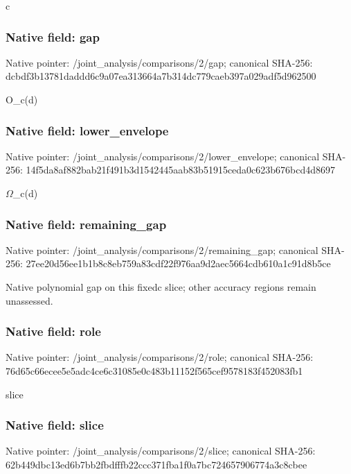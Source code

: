 \documentclass[10pt,a4paper]{article}
\begin{document}
c


\subsubsection{Native field: gap}


Native pointer: /joint\_analysis/comparisons/2/gap; canonical SHA-256: dcbdf3b13781daddd6c9a07e\allowbreak{}a313664a7b314dc779caeb39\allowbreak{}7a029adf5d962500


O\_c(d)


\subsubsection{Native field: lower\_envelope}


Native pointer: /joint\_analysis/comparis\allowbreak{}ons/2/lower\_envelope; canonical SHA-256: 14f5da8af882bab21f491b3d\allowbreak{}1542445aab83b51915ceda0c\allowbreak{}623b676bcd4d8697


\ensuremath{\Omega}\_c(d)


\subsubsection{Native field: remaining\_gap}


Native pointer: /joint\_analysis/comparis\allowbreak{}ons/2/remaining\_gap; canonical SHA-256: 27ee20d56ee1b1b8c8eb759a\allowbreak{}83cdf22f976aa9d2aec5664c\allowbreak{}db610a1c91d8b5ce


Native polynomial gap on this fixedc slice; other accuracy regions remain unassessed.


\subsubsection{Native field: role}


Native pointer: /joint\_analysis/comparisons/2/role; canonical SHA-256: 76d65c66ecee5e5adc4ce6c3\allowbreak{}1085e0c483b11152f565cef9\allowbreak{}578183f452083fb1


slice


\subsubsection{Native field: slice}


Native pointer: /joint\_analysis/comparisons/2/slice; canonical SHA-256: 62b449dbc13ed6b7bb2fbdff\allowbreak{}fb22ccc371fba1f0a7bc7246\allowbreak{}57906774a3c8cbee
\end{document}
